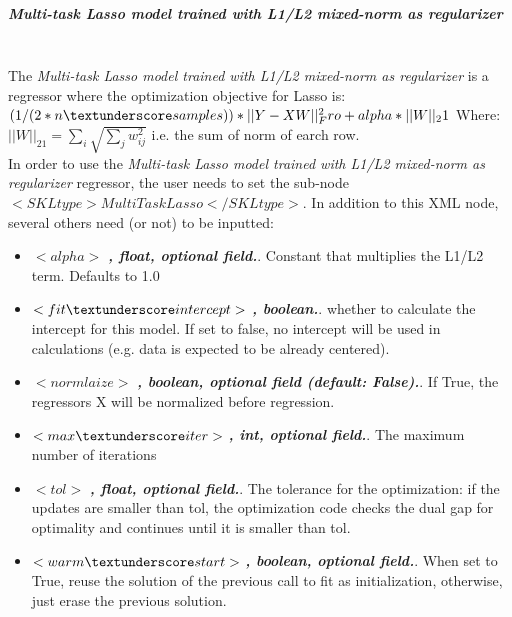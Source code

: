 \subparagraph{Multi-task Lasso model trained with L1/L2 mixed-norm as regularizer }
\mbox{}
\\The \textit{Multi-task Lasso model trained with L1/L2 mixed-norm as regularizer} is a regressor where the optimization objective for Lasso is:
$(1 / (2 * n \textunderscore samples)) * ||Y - XW||^2_Fro + alpha * ||W||_21$
Where:
$||W||_21 = \sum_i \sqrt{\sum_j w_{ij}^2}$
i.e. the sum of norm of earch row.
\\In order to use the \textit{Multi-task Lasso model trained with L1/L2 mixed-norm as regularizer} regressor, the user needs to set the sub-node $<SKLtype>MultiTaskLasso</SKLtype>$.
In addition to this XML node, several others need (or not) to be inputted:
\begin{itemize}
  \item $<alpha>$ \textbf{\textit{, float, optional field.}}. Constant that multiplies the L1/L2 term. Defaults to 1.0
  \item $<fit \textunderscore intercept>$ \textbf{\textit{, boolean.}}. whether to calculate the intercept for this model. If set to false, no intercept will be used in calculations (e.g. data is expected to be already centered).
  \item $<normlaize>$ \textbf{\textit{, boolean, optional field (default: False).}}. If True, the regressors X will be normalized before regression.
  \item $<max \textunderscore iter>$ \textbf{\textit{, int, optional field.}}. The maximum number of iterations
  \item $<tol>$ \textbf{\textit{, float, optional field.}}. The tolerance for the optimization: if the updates are smaller than tol, the optimization code checks the dual gap for optimality and continues until it is smaller than tol.
  \item $<warm \textunderscore start>$ \textbf{\textit{, boolean, optional field.}}. When set to True, reuse the solution of the previous call to fit as initialization, otherwise, just erase the previous solution.
\end{itemize}

